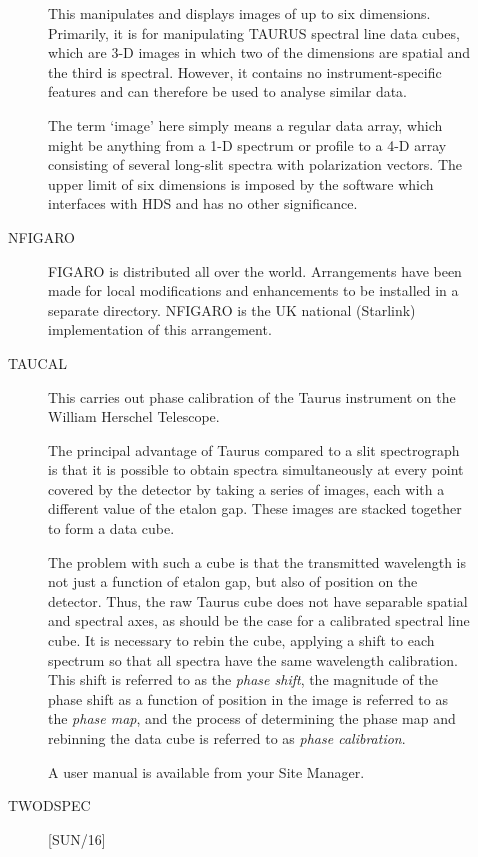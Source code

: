 \begin{description}
\begin{description}
This manipulates and displays images of up to six dimensions.
Primarily, it is for manipulating TAURUS spectral line data cubes, which are
3-D images in which two of the dimensions are spatial and the third is spectral.
However, it contains no instrument-specific features and can therefore be used
to analyse similar data. 

The term `image' here simply means a regular data array, which might be
anything from a 1-D spectrum or profile to a 4-D array consisting of several
long-slit spectra with polarization vectors.
The upper limit of six dimensions is imposed by the software which interfaces
with HDS and has no other significance. 

\item [NFIGARO] \mbox{}

FIGARO is distributed all over the world.
Arrangements have been made for local modifications and enhancements to be
installed in a separate directory.
NFIGARO is the UK national (Starlink) implementation of this arrangement.

\item [TAUCAL] \mbox{}

This carries out phase calibration of the Taurus instrument on the William
Herschel Telescope.

The principal advantage of Taurus compared to a slit spectrograph is that
it is possible to obtain spectra simultaneously at every point covered by the 
detector by taking a series of images, each with a different value of the
etalon gap.
These images are stacked together to form a data cube.

The problem with such a cube is that the transmitted wavelength is not just a
function of etalon gap, but also of position on the detector.
Thus, the raw Taurus cube does not have separable spatial and spectral axes,
as should be the case for a calibrated spectral line cube.
It is necessary to rebin the cube, applying a shift to each spectrum so
that all spectra have the same wavelength calibration.
This shift is referred to as the {\em phase shift}, the magnitude of the phase
shift as a function of position in the image is referred to as the {\em phase
map}, and the process of determining the phase map and rebinning the data cube
is referred to as {\em phase calibration}.

A user manual is available from your Site Manager.

\item [TWODSPEC] \hfill [SUN/16]


\end{description}
\end{description}
